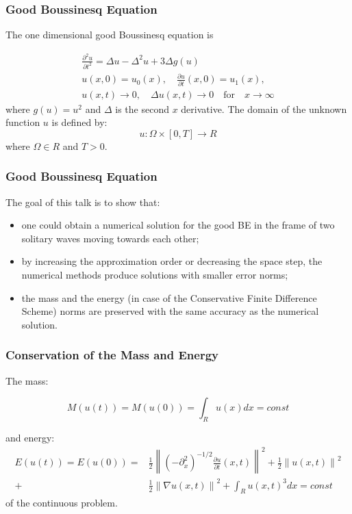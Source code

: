 \documentclass{beamer}
\newcommand{\be}{\begin{equation}}
\newcommand{\ee}{\end{equation}}
\begin{document}
\begin{frame}
\frametitle{Good Boussinesq Equation}


The one dimensional good Boussinesq equation is

\begin{align}\label{problem}
 \frac{\partial^2 u}{\partial t^2}= \Delta u -  \Delta^2 u +  3 \Delta g(u)
\\
u(x,0) = u_0(x), \quad \frac{\partial u}{\partial t}(x,0)=u_1(x), \nonumber
\\
u(x,t) \rightarrow 0, \quad \Delta u(x, t) \rightarrow 0 \quad \text{for} \quad x \rightarrow \infty \nonumber
\end{align}
where $g(u) = u^2$ and $\Delta$ is the second $x$ derivative. The domain of the unknown function $u$ is defined by:
\be
 u:\Omega \times [0, T] \rightarrow R
\ee
where $\Omega \in R$ and $T>0$.
\end{frame}



\begin{frame}
\frametitle{Good Boussinesq Equation}

The goal of this talk is to show that:
\begin{itemize}
 \item one could obtain a numerical solution for the good BE in the frame of two solitary waves moving towards each other;
 \item by increasing the approximation order or decreasing the space step, the numerical methods produce  solutions with smaller error norms;
 \item the mass and the energy (in case of the Conservative Finite Difference Scheme) norms are preserved with the same accuracy as the numerical solution.
\end{itemize}

\end{frame}


\begin{frame}
\frametitle{Conservation of the Mass and Energy}
The mass:

\begin{equation}\label{int}
M(u(t))=M(u(0))=\int_{R} u(x)dx = const
\end{equation}

and energy:
\begin{align}\label{ex-en}
E(u(t)) = E(u(0)) =&\frac{1}{2} \left\|(-\partial^2_x)^{-1/2} \frac{\partial u}{\partial t}(x,t)\right\|^2 + \frac{1}{2}  \left\|u (x,t)\right\|^2 
 \nonumber\\
+& \frac{1}{2}\left\| \nabla u(x,t) \right\|^2+ \int _{R} u(x,t)^3  dx = const
\end{align}
of the continuous problem.
\end{frame}
\end{document}
